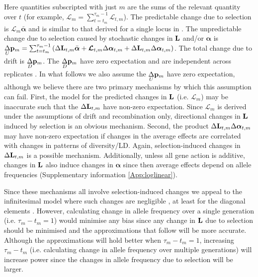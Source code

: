 \documentclass[12pt]{article}
\begin{document}
\begin{bibunit}
Here quantities subscripted with just $m$ are the sums of the relevant quantity over $t$ (for example, $\boldsymbol{\mathcal{L}}_m=\sum_{t=t_m}^{\tau_m-1}\boldsymbol{\mathcal{L}}_{t,m}$). The predictable change due to selection is $\boldsymbol{\mathcal{L}}_{m}\bar{\boldsymbol{\alpha}}$ and is similar to that derived for a single locus in \citet{Santiago.1998}. The unpredictable change due to selection caused by stochastic changes in  ${\bf L}$ and/or $\boldsymbol{\alpha}$ is $\underset{U}\Delta {\bf p}_{m}=\sum_{t=t_m}^{\tau_m-1}\left(\Delta{\bf L}_{t,m}\bar{\boldsymbol{\alpha}}+\boldsymbol{\mathcal{L}}_{t,m}\Delta\boldsymbol{\alpha}_{t,m}+\Delta{\bf L}_{t,m}\Delta\boldsymbol{\alpha}_{t,m}\right)$. The total change due to drift is $\underset{D}\Delta {\bf p}_m$. The $\underset{D}\Delta {\bf p}_m$ have zero expectation and are independent across replicates \citep{buffalo2019linked}. In what follows we also assume the $\underset{U}\Delta {\bf p}_m$ have zero expectation, although we believe there are two primary mechanisms by which this assumption can fail. First, the model for the predicted changes in ${\bf L}$ (i.e. $\boldsymbol{\mathcal{L}}_m$) may be inaccurate such that the $\Delta{\bf L}_{t,m}$ have non-zero expectation. Since $\boldsymbol{\mathcal{L}}_m$ is derived under the assumptions of drift and recombination only, directional changes in ${\bf L}$ induced by selection is an obvious mechanism.  Second, the product $\Delta{\bf L}_{t,m}\Delta\boldsymbol{\alpha}_{t,m}$ may have non-zero expectation if changes in the average effects are correlated with changes in patterns of diversity/LD. Again, selection-induced changes in $\Delta{\bf L}_{t,m}$ is a possible mechanism. Additionally, unless all gene action is additive, changes in ${\bf L}$ also induce changes in $\boldsymbol{\alpha}$ since then average effects depend on allele frequencies (Supplementary information \ref{App:loglinear}). 

Since these mechanisms all involve selection-induced changes we appeal to the infinitesimal model where such changes are negligible \citep{Barton.2017}, at least for the diagonal elements \citep{Bulmer.1971}. However, calculating change in allele frequency over a single generation (i.e. $\tau_m-t_m=1$) would minimise any bias since any change in ${\bf L}$ due to selection should be minimised and the approximations that follow will be more accurate.  Although the approximations will hold better when $\tau_m-t_m=1$, increasing  $\tau_m-t_m$ (i.e. calculating change in allele frequency over multiple generations) will increase power since the changes in allele frequency due to selection will be larger. 


\end{bibunit}
\end{document}
